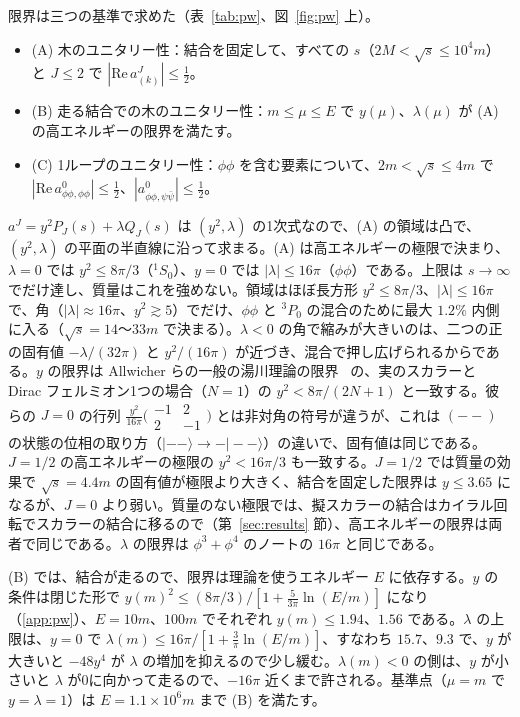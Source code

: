 \documentclass[a4paper,10pt]{ltjsarticle}
\begin{document}
限界は三つの基準で求めた（表~\ref{tab:pw}、図~\ref{fig:pw} 上）。
\begin{itemize}
\item (A) 木のユニタリー性：結合を固定して、すべての $s$（$2M<\sqrt s\le10^4m$）と $J\le2$ で $|\mathrm{Re}\,a^J_{(k)}|\le\frac12$。
\item (B) 走る結合での木のユニタリー性：$m\le\mu\le E$ で $y(\mu)$、$\lambda(\mu)$ が (A) の高エネルギーの限界を満たす。
\item (C) 1ループのユニタリー性：$\phi\phi$ を含む要素について、$2m<\sqrt s\le4m$ で $|\mathrm{Re}\,a^0_{\phi\phi,\phi\phi}|\le\frac12$、$|a^0_{\phi\phi,\psi\bar\psi}|\le\frac12$。
\end{itemize}
$a^J=y^2P_J(s)+\lambda Q_J(s)$ は $(y^2,\lambda)$ の1次式なので、(A) の領域は凸で、$(y^2,\lambda)$ の平面の半直線に沿って求まる。(A) は高エネルギーの極限で決まり、$\lambda=0$ では $y^2\le8\pi/3$（${}^1S_0$）、$y=0$ では $|\lambda|\le16\pi$（$\phi\phi$）である。上限は $s\to\infty$ でだけ達し、質量はこれを強めない。領域はほぼ長方形 $y^2\le8\pi/3$、$|\lambda|\le16\pi$ で、角（$|\lambda|\approx16\pi$、$y^2\gtrsim5$）でだけ、$\phi\phi$ と ${}^3P_0$ の混合のために最大 $1.2\%$ 内側に入る（$\sqrt s=14$〜$33m$ で決まる）。$\lambda<0$ の角で縮みが大きいのは、二つの正の固有値 $-\lambda/(32\pi)$ と $y^2/(16\pi)$ が近づき、混合で押し広げられるからである。$y$ の限界は Allwicher らの一般の湯川理論の限界~\cite{allwicher} の、実のスカラーと Dirac フェルミオン1つの場合（$N=1$）の $y^2<8\pi/(2N+1)$ と一致する。彼らの $J=0$ の行列 $\frac{y^2}{16\pi}\bigl(\begin{smallmatrix}-1&2\\2&-1\end{smallmatrix}\bigr)$ とは非対角の符号が違うが、これは $(--)$ の状態の位相の取り方（$|--\rangle\to-|--\rangle$）の違いで、固有値は同じである。$J=1/2$ の高エネルギーの極限の $y^2<16\pi/3$ も一致する。$J=1/2$ では質量の効果で $\sqrt s=4.4m$ の固有値が極限より大きく、結合を固定した限界は $y\le3.65$ になるが、$J=0$ より弱い。質量のない極限では、擬スカラーの結合はカイラル回転でスカラーの結合に移るので（第~\ref{sec:results} 節）、高エネルギーの限界は両者で同じである。$\lambda$ の限界は $\phi^3+\phi^4$ のノートの $16\pi$ と同じである。

(B) では、結合が走るので、限界は理論を使うエネルギー $E$ に依存する。$y$ の条件は閉じた形で $y(m)^2\le(8\pi/3)/[1+\frac{5}{3\pi}\ln(E/m)]$ になり（\ref{app:pw}）、$E=10m$、$100m$ でそれぞれ $y(m)\le1.94$、$1.56$ である。$\lambda$ の上限は、$y=0$ で $\lambda(m)\le16\pi/[1+\frac3\pi\ln(E/m)]$、すなわち $15.7$、$9.3$ で、$y$ が大きいと $-48y^4$ が $\lambda$ の増加を抑えるので少し緩む。$\lambda(m)<0$ の側は、$y$ が小さいと $\lambda$ が0に向かって走るので、$-16\pi$ 近くまで許される。基準点（$\mu=m$ で $y=\lambda=1$）は $E=1.1\times10^6m$ まで (B) を満たす。
\end{document}
